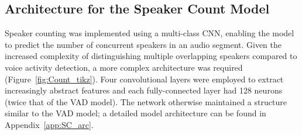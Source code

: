 \subsection{Architecture for the Speaker Count Model}
Speaker counting was implemented using a multi-class CNN, enabling the model to predict the number of concurrent speakers in an audio segment. Given the increased complexity of distinguishing multiple overlapping speakers compared to voice activity detection, a more complex architecture was required (Figure~\ref{fig:Count_tikz}). Four convolutional layers were employed to extract increasingly abstract features and each fully-connected layer had 128 neurons (twice that of the VAD model). The network otherwise maintained a structure similar to the VAD model; a detailed model architecture can be found in Appendix~\ref{app:SC_arc}.


